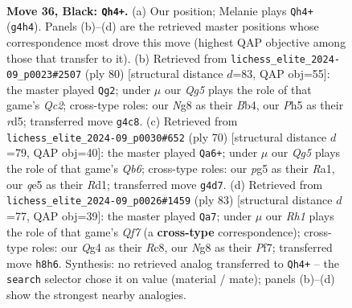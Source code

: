 \documentclass[11pt]{article}
\begin{document}
\clearpage

\begin{figure}[p]\centering
\begin{subfigure}{0.46\textwidth}\centering
\resizebox{\linewidth}{!}{%
\newchessgame
\chessboard[
  setfen={6nr/1kr3p1/8/2p1Q1Pp/2P2Pq1/N3B3/PP5K/1R6 b - - 10 36},
  showmover=false,
  pgfstyle=straightmove, color=movearrow, markmove={g4-h4}
]}
\caption{}
\end{subfigure}\hfill
\begin{subfigure}{0.46\textwidth}\centering
\resizebox{\linewidth}{!}{%
\newchessgame
\chessboard[
  setfen={4r3/5p1k/2R3p1/3rp2p/1B3b2/P4P1q/2Q4P/5R1K w - - 5 41},
  showmover=false,
  pgfstyle=straightmove, color=movearrow, markmove={c2-g2}
]}
\caption{}
\end{subfigure}
\\[4pt]
\begin{subfigure}{0.46\textwidth}\centering
\resizebox{\linewidth}{!}{%
\newchessgame
\chessboard[
  setfen={2kr1b2/5p2/1Q3P2/2Nq4/1p1p4/1Pp2nP1/5P2/R2R3K w - - 5 36},
  showmover=false,
  pgfstyle=straightmove, color=movearrow, markmove={b6-a6}
]}
\caption{}
\end{subfigure}\hfill
\begin{subfigure}{0.46\textwidth}\centering
\resizebox{\linewidth}{!}{%
\newchessgame
\chessboard[
  setfen={r1r3k1/2P2p2/2Qp2p1/3P4/4PP2/1KN5/p4q2/R7 b - - 6 42},
  showmover=false,
  pgfstyle=straightmove, color=movearrow, markmove={f2-a7}
]}
\caption{}
\end{subfigure}
\caption{\textbf{Move 36, Black: \texttt{Qh4+}.} (a) Our position; Melanie plays \texttt{Qh4+} (\texttt{g4h4}). Panels (b)--(d) are the retrieved master positions whose correspondence most drove this move (highest QAP objective among those that transfer to it). (b) Retrieved from \texttt{lichess\_elite\_2024-09\_p0023\#2507} (ply 80) [structural distance $d$=83, QAP obj=55]: the master played \texttt{Qg2}; under $\mu$ our \emph{Qg5} plays the role of that game's \emph{Qc2}; cross-type roles: our \emph{N}g8 as their \emph{B}b4, our \emph{P}h5 as their \emph{r}d5; transferred move \texttt{g4c8}. (c) Retrieved from \texttt{lichess\_elite\_2024-09\_p0030\#652} (ply 70) [structural distance $d$=79, QAP obj=40]: the master played \texttt{Qa6+}; under $\mu$ our \emph{Qg5} plays the role of that game's \emph{Qb6}; cross-type roles: our \emph{p}g5 as their \emph{R}a1, our \emph{q}e5 as their \emph{R}d1; transferred move \texttt{g4d7}. (d) Retrieved from \texttt{lichess\_elite\_2024-09\_p0026\#1459} (ply 83) [structural distance $d$=77, QAP obj=39]: the master played \texttt{Qa7}; under $\mu$ our \emph{Rh1} plays the role of that game's \emph{Qf7} (a \textbf{cross-type} correspondence); cross-type roles: our \emph{Q}g4 as their \emph{R}c8, our \emph{N}g8 as their \emph{P}f7; transferred move \texttt{h8h6}. Synthesis: no retrieved analog transferred to \texttt{Qh4+} -- the \texttt{search} selector chose it on value (material / mate); panels (b)--(d) show the strongest nearby analogies.}
\label{fig:thought-m71}
\end{figure}
\end{document}
